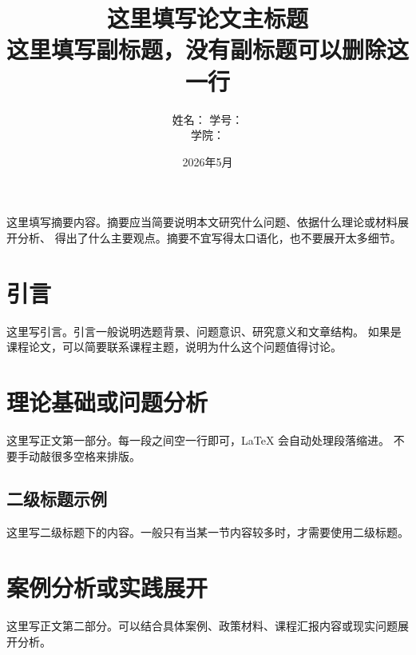 \documentclass[UTF8,zihao=-4,a4paper]{ctexart}
\title{\titlehei\zihao{3} 这里填写论文主标题\\
\large 这里填写副标题，没有副标题可以删除这一行}
\author{
姓名：\underline{\makebox[3cm][c]{张三}}
\quad
学号：\underline{\makebox[3cm][c]{12345678}}\\
学院：\underline{\makebox[3cm][c]{某某学院}}
}
\date{2026年5月}
\renewenvironment{abstract}
  {\par\noindent{\titlehei\zihao{-4}摘要：}\songti\zihao{-4}}
  {\par\vspace{0.5em}}
\begin{document}
\maketitle

\begin{abstract}
  这里填写摘要内容。摘要应当简要说明本文研究什么问题、依据什么理论或材料展开分析、
  得出了什么主要观点。摘要不宜写得太口语化，也不要展开太多细节。
\end{abstract}


\section{引言}

这里写引言。引言一般说明选题背景、问题意识、研究意义和文章结构。
如果是课程论文，可以简要联系课程主题，说明为什么这个问题值得讨论。

\section{理论基础或问题分析}

这里写正文第一部分。每一段之间空一行即可，LaTeX 会自动处理段落缩进。
不要手动敲很多空格来排版。

\subsection{二级标题示例}

这里写二级标题下的内容。一般只有当某一节内容较多时，才需要使用二级标题。

\section{案例分析或实践展开}

这里写正文第二部分。可以结合具体案例、政策材料、课程汇报内容或现实问题展开分析。
\end{document}
